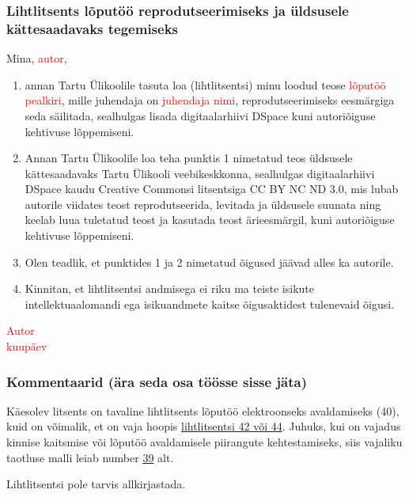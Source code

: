 \subsubsection*{Lihtlitsents lõputöö reprodutseerimiseks ja üldsusele kättesaadavaks tegemiseks}

Mina, \textcolor{red}{autor},

\begin{enumerate}
\item annan Tartu Ülikoolile tasuta loa (lihtlitsentsi) minu loodud teose \textcolor{red}{lõputöö pealkiri}, mille juhendaja on \textcolor{red}{juhendaja nimi}, reprodutseerimiseks eesmärgiga seda säilitada, sealhulgas lisada digitaalarhiivi DSpace kuni autoriõiguse kehtivuse lõppemiseni.

\item  Annan Tartu Ülikoolile loa teha punktis 1 nimetatud teos üldsusele kättesaadavaks Tartu Ülikooli veebikeskkonna, sealhulgas digitaalarhiivi DSpace kaudu Creative Commonsi litsentsiga CC BY NC ND 3.0, mis lubab autorile viidates teost reprodutseerida, levitada ja üldsusele suunata ning keelab luua tuletatud teost ja kasutada teost ärieesmärgil, kuni autoriõiguse kehtivuse lõppemiseni.

\item  Olen teadlik, et punktides 1 ja 2 nimetatud õigused jäävad alles ka autorile.

\item Kinnitan, et lihtlitsentsi andmisega ei riku ma teiste isikute intellektuaalomandi ega isikuandmete kaitse õigusaktidest tulenevaid õigusi.
\end{enumerate}

\textcolor{red}{Autor}\\
\textcolor{red}{kuupäev}\\


\subsubsection*{Kommentaarid (ära seda osa töösse sisse jäta)}
Käesolev litsents on tavaline lihtlitsents lõputöö elektroonseks avaldamiseks (40), kuid on võimalik, et on vaja hoopis \href{http://dok.ut.ee/wd/?page=pub_list_dynobj&desktop=57835&tid=70993&data_only=true&search=Otsi&field_100193_search_type=ANY&field_100193_text_search_value=ppimine}{lihtlitsentsi 42 või 44}.
Juhuks, kui on vajadus kinnise kaitsmise või lõputöö avaldamisele piirangute kehtestamiseks, siis vajaliku taotluse malli leiab number \href{http://dok.ut.ee/wd/?page=pub_list_dynobj&desktop=57835&tid=70993&data_only=true&search=Otsi&field_100193_search_type=ANY&field_100193_text_search_value=ppimine}{39} alt.

Lihtlitsentsi pole tarvis allkirjastada.
